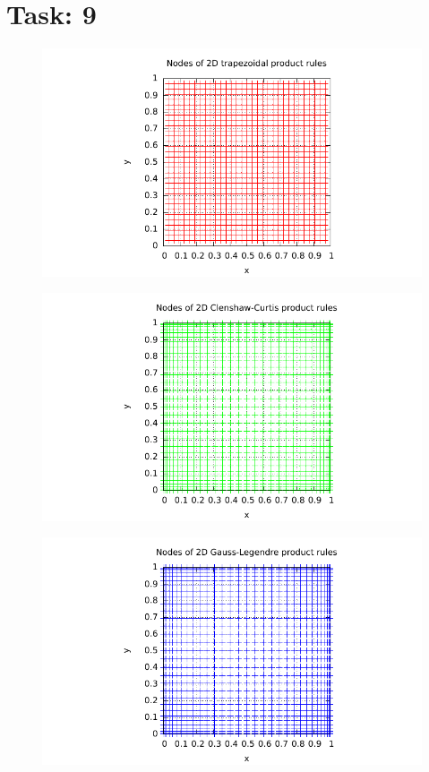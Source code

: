 \documentclass{article}
\begin{document}
\section*{Task: 9}
\begin{figure}[htbp]
  \centering
     \includegraphics[width=1.0\textwidth]{../Task09/sh3_task9_point_plot_trapezoidal.pdf}
\end{figure}
\newpage
\begin{figure}[htbp]
  \centering
     \includegraphics[width=1.0\textwidth]{../Task09/sh3_task9_point_plot_clenshawCurtis.pdf}
\end{figure}

\begin{figure}[htbp]
  \centering
     \includegraphics[width=1.0\textwidth]{../Task09/sh3_task9_point_plot_gaussLegendre.pdf}
\end{figure}
\end{document}
